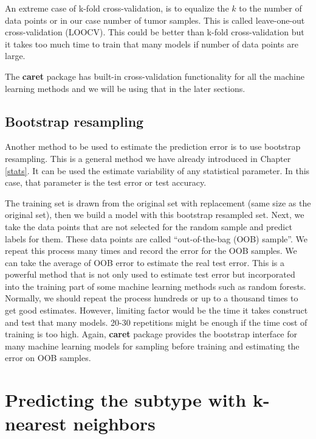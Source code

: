 \documentclass[12pt,]{krantz}
\begin{document}
An extreme case of k-fold cross-validation, is to equalize the \(k\) to the number of data points or in our case number of tumor samples. This is called leave-one-out cross-validation (LOOCV). This could be better than k-fold cross-validation but it takes too much time to train that many models if number of data points are large.

The \textbf{caret} package has built-in cross-validation functionality for all the machine learning methods and we will be using that in the later sections.

\hypertarget{bootstrap-resampling}{%
\subsection{Bootstrap resampling}\label{bootstrap-resampling}}

Another method to be used to estimate the prediction error is to use bootstrap resampling. This is a general method we have already introduced in Chapter \ref{stats}. It can be used the estimate variability of any statistical parameter. In this case, that parameter is the test error or test accuracy.

The training set is drawn from the original set with replacement (same size as the original set), then we build a model with this bootstrap resampled set. Next, we take the data points that are not selected for the random sample and predict labels for them. These data points are called ``out-of-the-bag (OOB) sample''. We repeat this process many times and record the error for the OOB samples. We can take the average of OOB error to estimate the real test error. This is a powerful method that is not only used to estimate test error but incorporated into the training part of some machine learning methods such as random forests. Normally, we should repeat the process hundreds or up to a thousand times to get good estimates. However, limiting factor would be the time it takes construct and test that many models. 20-30 repetitions might be enough if the time cost of training is too high. Again, \textbf{caret} package provides the bootstrap interface for many machine learning models for sampling before training and estimating the error on OOB samples.

\hypertarget{predicting-the-subtype-with-k-nearest-neighbors}{%
\section{Predicting the subtype with k-nearest neighbors}\label{predicting-the-subtype-with-k-nearest-neighbors}}
\end{document}
